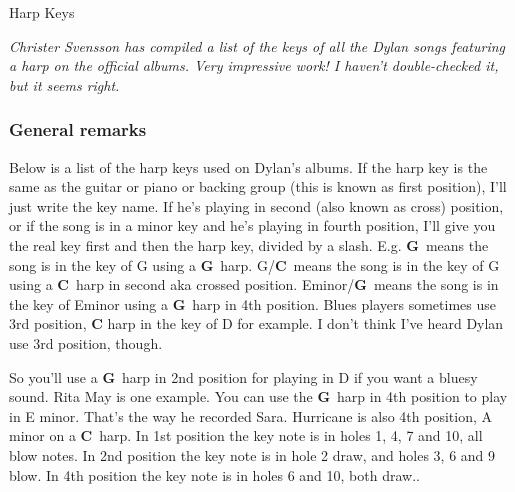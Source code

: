 
\thispagestyle{empty}
\label{harpkeys}

\vspace*{20ex}

\begin{articlelayout}
\begin{flushright}{\Huge Harp Keys}\end{flushright}

\vspace{10ex}


\newcommand{\G}{\textcolor{G}{\textbf{G}}}
\newcommand{\A}{\textcolor{A}{\textbf{A}}}
\newcommand{\C}{\textcolor{C}{\textbf{C}}}
\newcommand{\D}{\textcolor{D}{\textbf{D}}}
\newcommand{\E}{\textcolor{E}{\textbf{E}}}

\noindent \textit{Christer Svensson has compiled a list of the keys of all
the Dylan songs featuring a harp on the official albums. Very impressive
work! I haven't double-checked it, but it seems right.}


\subsubsection*{General remarks}

Below is a list of the harp keys used on Dylan's albums. If the harp
key is the same as the guitar or piano or backing group (this is known
as first position), I'll just write the key name. If he's playing in
second (also known as cross) position, or if the song is in a minor
key and he's playing in fourth position, I'll give you the real
key first and then the harp key, divided by a slash. E.g. \G\ means
the song is in the key of G using a \G~harp. G/\C\ means the song is
in the key of G using a \C~harp in second aka crossed
position. Eminor/\G\ means the song is in the key of Eminor using a
\G~harp in 4th position. Blues players sometimes use 3rd position, \C
harp in the key of D for example. I don't think I've heard Dylan use
3rd position, though.

So you'll use a \G~harp in 2nd position for playing in D if you want a
bluesy sound. Rita May is one example. You can use the \G~harp in
4th position to play in E minor. That's the way he recorded
Sara. Hurricane is also 4th position, A minor on a \C~harp. In
1st position the key note is in holes 1, 4, 7 and 10, all blow
notes. In 2nd position the key note is in hole 2 draw, and holes 3, 6
and 9 blow. In 4th position the key note is in holes 6 and 10, both
draw..



\end{articlelayout}

